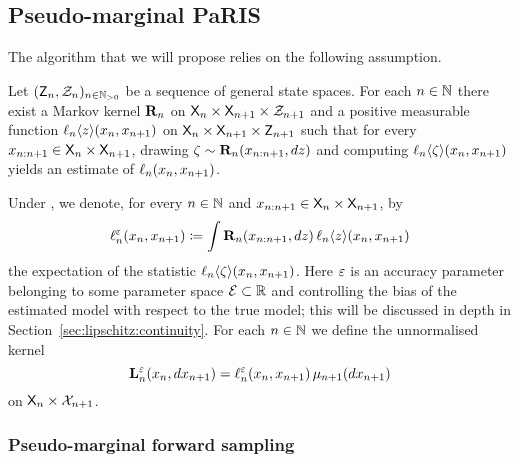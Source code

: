 \subsection{Pseudo-marginal PaRIS}

The algorithm that we will propose relies on the following assumption. 
 
\begin{hypH}
\label{assum:biased:estimate}
Let $(\mathsf{Z}_n, \mathcal{Z}_n)_{n \in \mathbb{N}_{> 0}}$ be a sequence of general state spaces. For each $n \in \mathbb{N}$ there exist a Markov kernel $\mathbf{R}_{n}$ on $\mathsf{X}_n \times \mathsf{X}_{n + 1} \times \mathcal{Z}_{n + 1}$ and a positive measurable function $\ell_{n} \langle z \rangle(x_n, x_{n + 1})$ on $\mathsf{X}_n \times \mathsf{X}_{n + 1} \times \mathsf{Z}_{n + 1}$ such that for every $x_{n:n + 1} \in \mathsf{X}_n \times \mathsf{X}_{n + 1}$, drawing $\zeta \sim \mathbf{R}_{n}(x_{n:n + 1}, d z)$ and computing $\ell_{n} \langle \zeta \rangle(x_n, x_{n + 1})$ yields an estimate of $\ell_{n}(x_n, x_{n + 1})$.  
\end{hypH}
Under , we denote, for every $n \in \mathbb{N}$ and $x_{n:n + 1} \in \mathsf{X}_n \times \mathsf{X}_{n + 1}$, by   
\begin{equation} \label{eq:def:udmod}
\udmod{n}(x_n, x_{n + 1}) \eqdef \int \ukdist{n}(x_{n:n + 1}, \rmd z) \, \ukest{n}{z}(x_n, x_{n + 1})
\end{equation}
the expectation of the statistic $\ell_{n} \langle \zeta \rangle(x_n, x_{n + 1})$. Here $\varepsilon$ is an accuracy parameter belonging to some parameter space $\mathcal{E} \subset \mathbb{R}$ and controlling the bias of the estimated model with respect to the true model; this will be discussed in depth in Section~\ref{sec:lipschitz:continuity}. For each $n \in \mathbb{N}$ we define the unnormalised kernel 
\begin{equation} \label{eq:def:ukmod}
    \ukmod{n}(x_n, \rmd x_{n + 1}) = \udmod{n}(x_n, x_{n + 1}) \, \mu_{n + 1}(\rmd x_{n + 1}) 
\end{equation}
on $\mathsf{X}_n \times \mathcal{X}_{n + 1}$. 
 

\subsubsection{Pseudo-marginal forward sampling}
\label{eq:sec:pm:forward:sampling}

